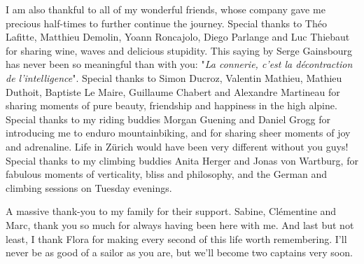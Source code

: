 I am also thankful to all of my wonderful friends, whose company gave me precious half-times to further continue the journey.
% 
Special thanks to Théo Lafitte, Matthieu Demolin, Yoann Roncajolo, Diego Parlange and Luc Thiebaut for sharing wine, waves and delicious stupidity. This saying by Serge Gainsbourg has never been so meaningful than with you: "\textit{La connerie, c'est la décontraction de l'intelligence}".
% 
Special thanks to Simon Ducroz, Valentin Mathieu, Mathieu Duthoit, Baptiste Le Maire, Guillaume Chabert and Alexandre Martineau for sharing moments of pure beauty, friendship and happiness in the high alpine.
% 
Special thanks to my riding buddies Morgan Guening and Daniel Grogg for introducing me to enduro mountainbiking, and for sharing sheer moments of joy and adrenaline. Life in Zürich would have been very different without you guys! 
% 
Special thanks to my climbing buddies Anita Herger and Jonas von Wartburg, for fabulous moments of verticality, bliss and philosophy, and the German and climbing sessions on Tuesday evenings.

A massive thank-you to my family for their support. Sabine, Clémentine and Marc, thank you so much for always having been here with me. 
% 
And last but not least, I thank Flora for making every second of this life worth remembering.
% 
I'll never be as good of a sailor as you are, but we'll become two captains very soon.
















